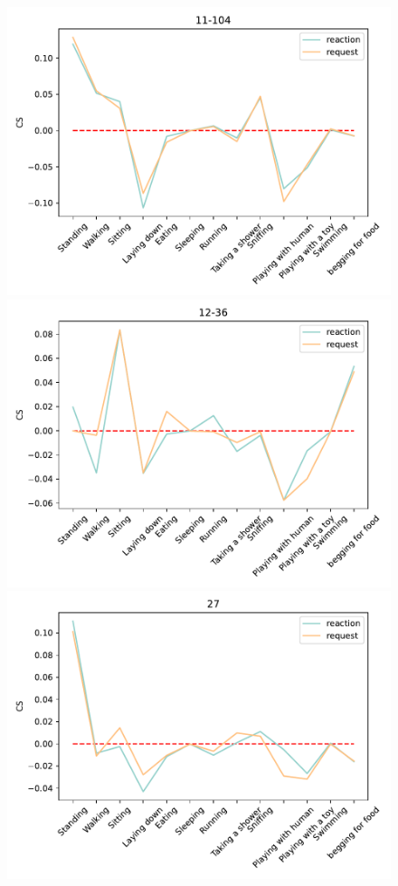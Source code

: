 \begin{figure}[ht]
		\begin{minipage}[b]{.3\linewidth}
			\centering
			\includegraphics[width=0.99\linewidth]{./35word/11-104.pdf}
		\end{minipage}
		\begin{minipage}[b]{.3\linewidth}
			\centering
			\includegraphics[width=0.99\linewidth]{./35word/12-36.pdf}
		\end{minipage}
		\begin{minipage}[b]{.3\linewidth}
			\centering
			\includegraphics[width=0.99\linewidth]{./35word/27.pdf}

\end{minipage}
\end{figure}
